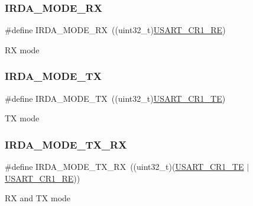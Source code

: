 \subsubsection{\texorpdfstring{I\+R\+D\+A\+\_\+\+M\+O\+D\+E\+\_\+\+RX}{IRDA\_MODE\_RX}}
{\footnotesize\ttfamily \#define I\+R\+D\+A\+\_\+\+M\+O\+D\+E\+\_\+\+RX~((uint32\+\_\+t)\hyperlink{group___peripheral___registers___bits___definition_gada0d5d407a22264de847bc1b40a17aeb}{U\+S\+A\+R\+T\+\_\+\+C\+R1\+\_\+\+RE})}

RX mode \mbox{\label{group___i_r_d_a___transfer___mode_ga9f26f67fa86746fab0039fe60a1ccefd}} 
\subsubsection{\texorpdfstring{I\+R\+D\+A\+\_\+\+M\+O\+D\+E\+\_\+\+TX}{IRDA\_MODE\_TX}}
{\footnotesize\ttfamily \#define I\+R\+D\+A\+\_\+\+M\+O\+D\+E\+\_\+\+TX~((uint32\+\_\+t)\hyperlink{group___peripheral___registers___bits___definition_gade7f090b04fd78b755b43357ecaa9622}{U\+S\+A\+R\+T\+\_\+\+C\+R1\+\_\+\+TE})}

TX mode \mbox{\label{group___i_r_d_a___transfer___mode_gada775794a25b76b7ecafc9bea3fc1f8a}} 
\subsubsection{\texorpdfstring{I\+R\+D\+A\+\_\+\+M\+O\+D\+E\+\_\+\+T\+X\+\_\+\+RX}{IRDA\_MODE\_TX\_RX}}
{\footnotesize\ttfamily \#define I\+R\+D\+A\+\_\+\+M\+O\+D\+E\+\_\+\+T\+X\+\_\+\+RX~((uint32\+\_\+t)(\hyperlink{group___peripheral___registers___bits___definition_gade7f090b04fd78b755b43357ecaa9622}{U\+S\+A\+R\+T\+\_\+\+C\+R1\+\_\+\+TE} $\vert$\hyperlink{group___peripheral___registers___bits___definition_gada0d5d407a22264de847bc1b40a17aeb}{U\+S\+A\+R\+T\+\_\+\+C\+R1\+\_\+\+RE}))}

RX and TX mode 